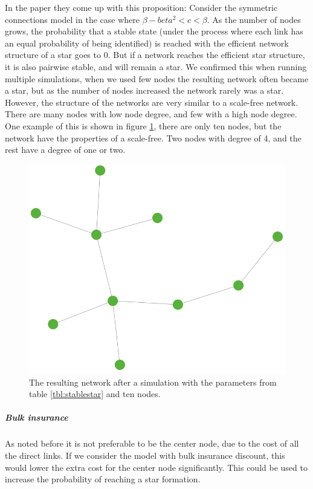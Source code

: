 In the paper \cite{jackson2005survey} they come up with this proposition:
Consider the symmetric connections model in the case where $\beta-beta^2<c<\beta$. As the number of nodes grows, the probability that a stable state (under the
process where each link has an equal probability of being identified) is reached with the
efficient network structure of a star goes to 0. But if a network reaches the efficient star structure, it is also pairwise stable, and will remain a star. 
We confirmed this when running multiple simulations, when we used few nodes the resulting network often became a star, but as the number of nodes increased the network rarely was a star. 
However, the structure of the networks are very similar to a scale-free network. There are many nodes with low node degree, and few with a high node degree.
One example of this is shown in figure \ref{fig:stablescalefree}, there are only ten nodes, but the network have the properties of a scale-free. Two nodes with degree of 4, and the rest have a degree of one or two.
\begin{figure}[h]
\centering
  \includegraphics[width=0.5\linewidth]{../Figures/stability/Unefficientbutstabletwo.png}
  \caption{\label{fig:stablescalefree} The resulting network after a simulation with the parameters from table \ref{tbl:stablestar} and ten nodes.}
\end{figure}
\subparagraph{Bulk insurance}
As noted before it is not preferable to be the center node, due to the cost of all the direct links. If we consider the model with bulk insurance discount, this would lower the extra cost for the center node significantly. This could be used to increase the probability of reaching a star formation. 

